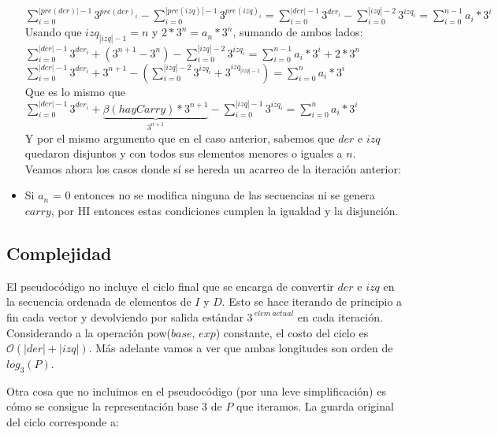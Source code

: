 \begin{itemize}
	$\sum_{i=0}^{|pre(der)|-1} 3^{pre(der)_i} - \sum_{i=0}^{|pre(izq)|-1} 3^{pre(izq)_i} = \sum_{i=0}^{|der|-1} 3^{der_i} - \sum_{i=0}^{|izq|-2} 3^{izq_i} = \sum_{i=0}^{n-1} a_i*3^{i} $
	\\

	Usando que $izq_{|izq|-1} = n$ y $ 2*3^{n} = a_{n}*3^{n}$, sumando de ambos lados:
	\\

	$\sum_{i=0}^{|der|-1} 3^{der_i} + (3^{n+1} - 3^{n}) - \sum_{i=0}^{|izq|-2} 3^{izq_i} = \sum_{i=0}^{n-1} a_i*3^{i} + 2*3^{n} $
	\\

	$\sum_{i=0}^{|der|-1} 3^{der_i} + 3^{n+1} - (\sum_{i=0}^{|izq|-2} 3^{izq_i} + 3^{izq_{|izq|-1}} ) = \sum_{i=0}^{n} a_i*3^{i}$
	\\

	Que es lo mismo que $\sum_{i=0}^{|der|-1} 3^{der_i} + \underbrace{\beta(hayCarry)*3^{n+1}}_\text{$3^{n+1}$} - \sum_{i=0}^{|izq|-1} 3^{izq_i} = \sum_{i=0}^{n} a_i*3^{i} $
	\\

	Y por el mismo argumento que en el caso anterior, sabemos que $der$ e $izq$ quedaron disjuntos y con todos sus elementos menores o iguales a $n$.
	\\

	Veamos ahora los casos donde sí se hereda un acarreo de la iteración anterior:

	\item Si $a_n$ = 0 entonces no se modifica ninguna de las secuencias ni se genera $carry$, por HI entonces estas condiciones cumplen la igualdad y la disjunción.

	\end{itemize}

\newpage
\subsection{Complejidad}
	El pseudocódigo no incluye el ciclo final que se encarga de convertir $der$ e $izq$ en la secuencia ordenada de elementos de $I$ y $D$. Esto se hace iterando de principio a fin cada vector y devolviendo por salida estándar $3^{\ elem \ actual}$ en cada iteración. Considerando a la operación pow($base$, $exp$) constante, el costo del ciclo es $\mathcal{O} (|der| + |izq|)$. Más adelante vamos a ver que ambas longitudes son orden de $log_3(P)$.

	Otra cosa que no incluimos en el pseudocódigo (por una leve simplificación) es cómo se consigue la representación base 3 de $P$ que iteramos. La guarda original del ciclo corresponde a:

